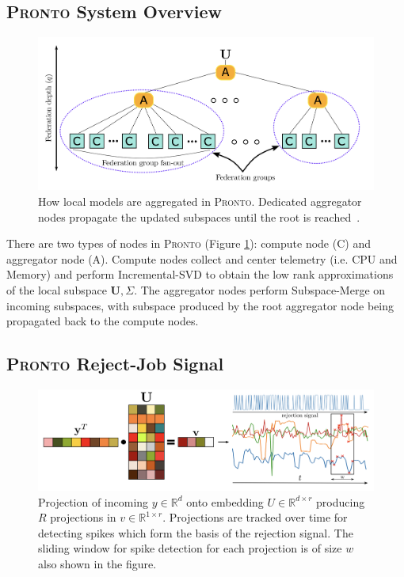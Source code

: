\subsection{\protect\textsc{Pronto} System Overview}
\begin{figure}[ht!]
    \centering
    \includegraphics[width=\textwidth]{images/pronto-agg.png}
    \caption{How local models are aggregated in \textsc{Pronto}. Dedicated aggregator
    nodes propagate the updated subspaces until the root is reached~\cite{grammenos_pronto_2021}.}
    \label{pronto-agg}
\end{figure}
There are two types of nodes in \textsc{Pronto} (Figure \ref{pronto-agg}):
compute node (C) and aggregator node (A). Compute nodes collect and center
telemetry (i.e. CPU and Memory) and perform Incremental-SVD to obtain the low
rank approximations of the local subspace $\mathbf{U},\Sigma$. The aggregator
nodes perform Subspace-Merge on incoming subspaces, with subspace produced by
the root aggregator node being propagated back to the compute nodes.

\subsection{\protect\textsc{Pronto} Reject-Job Signal}
\begin{figure}[ht!]
    \centering
    \includegraphics[width=\textwidth]{images/pronto}
    \caption{Projection of incoming $y \in \mathbb{R}^d$ onto embedding $U \in
    \mathbb{R}^{d \times r}$ producing $R$ projections in $v \in \mathbb{R}^{1
    \times r}$. Projections are tracked over time for detecting spikes which
    form the basis of the rejection signal. The sliding window for spike
    detection for each projection is of size $w$ also shown in the figure.}
    \label{pronto-components}
\end{figure}

